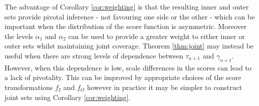 \begin{remark}
	The advantage of Corollary \ref{cor:weighting} is that the resulting inner and outer sets provide pivotal inference - not favouring one side or the other - which can be important when the distribution of the score function is asymmetric. Moreover the levels $\alpha_1$ and $\alpha_2$ can be used to provide a greater weight to either inner or outer sets whilst maintaining joint coverage. Theorem \ref{thm:joint} may instead be useful when there are strong levels of dependence between $\tau_{n+1}$ and $\gamma_{n+1}$. However, when this dependence is low, scale differences in the scores can lead to a lack of pivotality. This can be improved by appropriate choices of the score transformations $f_I$ and $f_O$ however in practice it may be simpler to construct joint sets using Corollary \ref{cor:weighting}. 
\end{remark}

